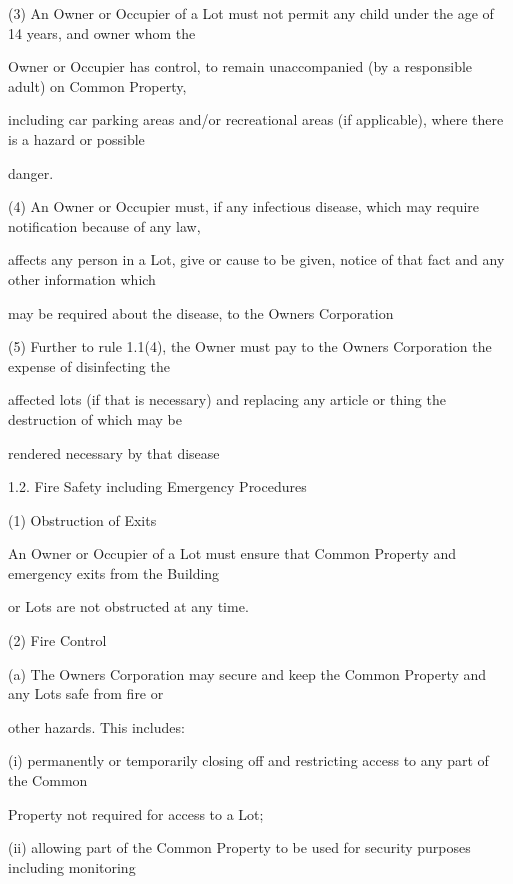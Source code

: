 \documentclass{article}
\begin{document}
{\fontsize{9.962}{1}(3) An Owner or Occupier of a Lot must not permit any child under the age of 14 years, and owner whom the }

{\fontsize{10.02}{1}Owner or Occupier has control, to remain unaccompanied (by a responsible adult) on Common Property, }

{\fontsize{10.02}{1}including car parking areas and/or recreational areas (if applicable), where there is a hazard or possible }

{\fontsize{10.02}{1}danger. }

{\fontsize{9.962}{1}(4) An Owner or Occupier must, if any infectious disease, which may require notification because of any law, }

{\fontsize{10.02}{1}affects any person in a Lot, give or cause to be given, notice of that fact and any other information which }

{\fontsize{10.02}{1}may be required about the disease, to the Owners Corporation }

{\fontsize{9.962}{1}(5) Further to rule 1.1(4), the Owner must pay to the Owners Corporation the expense of disinfecting the }

{\fontsize{10.02}{1}affected lots (if that is necessary) and replacing any article or thing the destruction of which may be }

{\fontsize{10.02}{1}rendered necessary by that disease }

{\fontsize{9.99}{1}1.2. Fire Safety including Emergency Procedures }

{\fontsize{9.962}{1}(1) Obstruction of Exits }

{\fontsize{10.02}{1}An Owner or Occupier of a Lot must ensure that Common Property and emergency exits from the Building }

{\fontsize{10.02}{1}or Lots are not obstructed at any time. }

{\fontsize{9.962}{1}(2) Fire Control }

{\fontsize{9.962}{1}(a) The Owners Corporation may secure and keep the Common Property and any Lots safe from fire or }

{\fontsize{10.02}{1}other hazards. This includes: }

{\fontsize{9.962}{1}(i) permanently or temporarily closing off and restricting access to any part of the Common }

{\fontsize{10.02}{1}Property not required for access to a Lot; }

{\fontsize{9.962}{1}(ii) allowing part of the Common Property to be used for security purposes including monitoring }
\end{document}
